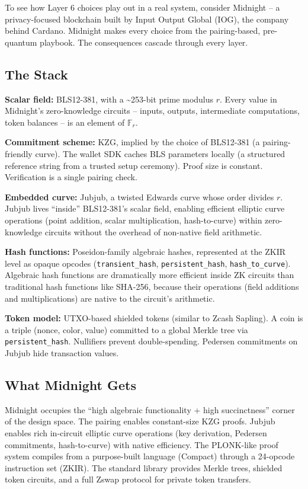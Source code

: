 \documentclass[
  11pt,
  openany]{report}
\renewcommand{\textbf}[1]{{\bfseries\color{MidnightBold}#1}}
\begin{document}
To see how Layer 6 choices play out in a real system, consider Midnight -- a
privacy-focused blockchain built by Input Output Global (IOG), the company
behind Cardano. Midnight makes every choice from the pairing-based, pre-quantum
playbook. The consequences cascade through every layer.

\subsection{The Stack}\label{the-stack}

\textbf{Scalar field:} BLS12-381, with a \textasciitilde253-bit prime modulus
\(r\). Every value in Midnight's zero-knowledge circuits -- inputs, outputs,
intermediate computations, token balances -- is an element of \(\mathbb{F}_r\).

\textbf{Commitment scheme:} KZG, implied by the choice of BLS12-381 (a
pairing-friendly curve). The wallet SDK caches BLS parameters locally (a
structured reference string from a trusted setup ceremony). Proof size is
constant. Verification is a single pairing check.

\textbf{Embedded curve:} Jubjub, a twisted Edwards curve whose order divides
\(r\). Jubjub lives ``inside'' BLS12-381's scalar field, enabling efficient
elliptic curve operations (point addition, scalar multiplication, hash-to-curve)
within zero-knowledge circuits without the overhead of non-native field
arithmetic.

\textbf{Hash functions:} Poseidon-family algebraic hashes, represented at the
ZKIR level as opaque opcodes (\texttt{transient\_hash},
\texttt{persistent\_hash}, \texttt{hash\_to\_curve}). Algebraic hash functions
are dramatically more efficient inside ZK circuits than traditional hash
functions like SHA-256, because their operations (field additions and
multiplications) are native to the circuit's arithmetic.

\textbf{Token model:} UTXO-based shielded tokens (similar to Zcash Sapling). A
coin is a triple (nonce, color, value) committed to a global Merkle tree via
\texttt{persistent\_hash}. Nullifiers prevent double-spending. Pedersen
commitments on Jubjub hide transaction values.

\subsection{What Midnight Gets}\label{what-midnight-gets}

Midnight occupies the ``high algebraic functionality + high succinctness''
corner of the design space. The pairing enables constant-size KZG proofs. Jubjub
enables rich in-circuit elliptic curve operations (key derivation, Pedersen
commitments, hash-to-curve) with native efficiency. The PLONK-like proof system
compiles from a purpose-built language (Compact) through a 24-opcode instruction
set (ZKIR). The standard library provides Merkle trees, shielded token circuits,
and a full Zswap protocol for private token transfers.
\end{document}
